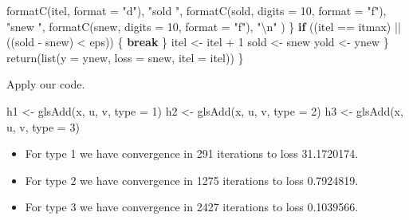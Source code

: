 \documentclass[
  12pt,
  letterpaper,
  DIV=11,
  numbers=noendperiod]{scrartcl}
\newenvironment{Shaded}{\begin{snugshade}}{\end{snugshade}}
\newcommand{\AttributeTok}[1]{\textcolor[rgb]{0.40,0.45,0.13}{#1}}
\newcommand{\ControlFlowTok}[1]{\textcolor[rgb]{0.00,0.23,0.31}{\textbf{#1}}}
\newcommand{\DecValTok}[1]{\textcolor[rgb]{0.68,0.00,0.00}{#1}}
\newcommand{\FunctionTok}[1]{\textcolor[rgb]{0.28,0.35,0.67}{#1}}
\newcommand{\NormalTok}[1]{\textcolor[rgb]{0.00,0.23,0.31}{#1}}
\newcommand{\OtherTok}[1]{\textcolor[rgb]{0.00,0.23,0.31}{#1}}
\newcommand{\SpecialCharTok}[1]{\textcolor[rgb]{0.37,0.37,0.37}{#1}}
\newcommand{\StringTok}[1]{\textcolor[rgb]{0.13,0.47,0.30}{#1}}
\providecommand{\tightlist}{%
  \setlength{\itemsep}{0pt}\setlength{\parskip}{0pt}}
\begin{document}
\begin{Shaded}
\begin{Highlighting}[]
        \FunctionTok{formatC}\NormalTok{(itel, }\AttributeTok{format =} \StringTok{"d"}\NormalTok{),}
        \StringTok{"sold "}\NormalTok{,}
        \FunctionTok{formatC}\NormalTok{(sold, }\AttributeTok{digits =} \DecValTok{10}\NormalTok{, }\AttributeTok{format =} \StringTok{"f"}\NormalTok{),}
        \StringTok{"snew "}\NormalTok{,}
        \FunctionTok{formatC}\NormalTok{(snew, }\AttributeTok{digits =} \DecValTok{10}\NormalTok{, }\AttributeTok{format =} \StringTok{"f"}\NormalTok{),}
        \StringTok{"}\SpecialCharTok{\textbackslash{}n}\StringTok{"}
\NormalTok{      )}
\NormalTok{    \}}
    \ControlFlowTok{if}\NormalTok{ ((itel }\SpecialCharTok{==}\NormalTok{ itmax) }\SpecialCharTok{||}\NormalTok{ ((sold }\SpecialCharTok{{-}}\NormalTok{ snew) }\SpecialCharTok{\textless{}}\NormalTok{ eps)) \{}
      \ControlFlowTok{break}
\NormalTok{    \}}
\NormalTok{    itel }\OtherTok{\textless{}{-}}\NormalTok{ itel }\SpecialCharTok{+} \DecValTok{1}
\NormalTok{    sold }\OtherTok{\textless{}{-}}\NormalTok{ snew}
\NormalTok{    yold }\OtherTok{\textless{}{-}}\NormalTok{ ynew}
\NormalTok{  \}}
  \FunctionTok{return}\NormalTok{(}\FunctionTok{list}\NormalTok{(}\AttributeTok{y =}\NormalTok{ ynew, }\AttributeTok{loss =}\NormalTok{ snew, }\AttributeTok{itel =}\NormalTok{ itel))}
\NormalTok{\}}
\end{Highlighting}
\end{Shaded}

Apply our code.

\begin{Shaded}
\begin{Highlighting}[]
\NormalTok{h1 }\OtherTok{\textless{}{-}} \FunctionTok{glsAdd}\NormalTok{(x, u, v, }\AttributeTok{type =} \DecValTok{1}\NormalTok{)}
\NormalTok{h2 }\OtherTok{\textless{}{-}} \FunctionTok{glsAdd}\NormalTok{(x, u, v, }\AttributeTok{type =} \DecValTok{2}\NormalTok{)}
\NormalTok{h3 }\OtherTok{\textless{}{-}} \FunctionTok{glsAdd}\NormalTok{(x, u, v, }\AttributeTok{type =} \DecValTok{3}\NormalTok{)}
\end{Highlighting}
\end{Shaded}

\begin{itemize}
\tightlist
\item
  For type 1 we have convergence in 291 iterations to loss 31.1720174.
\item
  For type 2 we have convergence in 1275 iterations to loss 0.7924819.
\item
  For type 3 we have convergence in 2427 iterations to loss 0.1039566.
\end{itemize}
\end{document}
